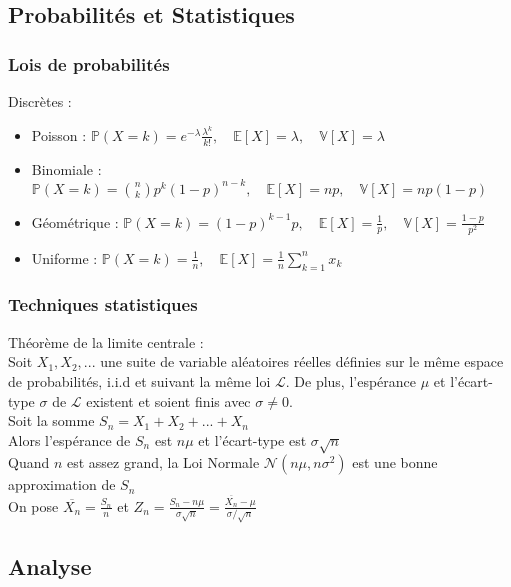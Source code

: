 \documentclass[8pt]{article}
\begin{document}
        \subsection{Probabilités et Statistiques}
            \subsubsection{Lois de probabilités}
            Discrètes :
                \begin{itemize}
                    \item Poisson : $\mathbb{P} (X=k) = e^{-\lambda}\frac{\lambda^k}{k!}, \quad \mathbb{E}[X]=\lambda, \quad \mathbb{V}[X]=\lambda$
                    \item Binomiale : $\mathbb{P}(X=k) = \binom{n}{k} p^k (1-p)^{n-k}, \quad \mathbb{E}[X] = np, \quad \mathbb{V}[X] = np(1-p)$
                    \item Géométrique : $\mathbb{P}(X=k) = (1-p)^{k-1}p, \quad \mathbb{E}[X] = \frac{1}{p}, \quad \mathbb{V}[X] = \frac{1-p}{p^{2}}$
                    \item Uniforme : $\mathbb{P}(X=k) = \frac{1}{n}, \quad \mathbb{E}[X] = \frac{1}{n}  \sum^{n}_{k=1} x_k$
                \end{itemize}
            \subsubsection{Techniques statistiques}
            Théorème de la limite centrale : \\
            Soit $X_1,X_2,...$ une suite de variable aléatoires réelles définies sur le même espace de probabilités, i.i.d et suivant la même loi $\mathcal{L}$.
            De plus, l'espérance $\mu$ et l'écart-type $\sigma$ de $\mathcal{L}$ existent et soient finis avec $\sigma \neq 0$.\\
            Soit la somme $S_n = X_1 + X_2 + ... + X_n$\\
            Alors l'espérance de $S_n$ est $n\mu$ et l'écart-type est $\sigma \sqrt{n}$\\
            Quand $n$ est assez grand, la Loi Normale $\mathcal{N}(n\mu,n\sigma^{2})$ est une bonne approximation de $S_n$\\
            On pose $\overline{X_n} = \frac{S_n}{n}$ et $Z_n = \frac{S_n-n\mu}{\sigma \sqrt{n}} = \frac{\overline{X_n}-\mu}{\sigma / \sqrt{n}}$
        \subsection{Analyse}
\end{document}

